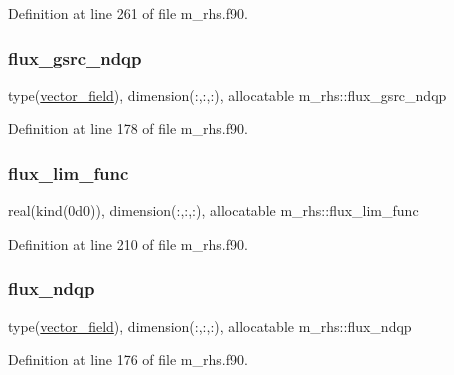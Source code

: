Definition at line 261 of file m\+\_\+rhs.\+f90.

\mbox{\label{namespacem__rhs_a5542f5954178123cbe052df43d09dc38}} 
\subsubsection{\texorpdfstring{flux\+\_\+gsrc\+\_\+ndqp}{flux\_gsrc\_ndqp}}
{\footnotesize\ttfamily type(\hyperlink{structm__derived__types_1_1vector__field}{vector\+\_\+field}), dimension(\+:,\+:,\+:), allocatable m\+\_\+rhs\+::flux\+\_\+gsrc\+\_\+ndqp}



Definition at line 178 of file m\+\_\+rhs.\+f90.

\mbox{\label{namespacem__rhs_a93dc4910f18014dacfb740debe18356d}} 
\subsubsection{\texorpdfstring{flux\+\_\+lim\+\_\+func}{flux\_lim\_func}}
{\footnotesize\ttfamily real(kind(0d0)), dimension(\+:,\+:,\+:), allocatable m\+\_\+rhs\+::flux\+\_\+lim\+\_\+func}



Definition at line 210 of file m\+\_\+rhs.\+f90.

\mbox{\label{namespacem__rhs_a10d1ea6f5c8a0d7137be28b1e8c4780f}} 
\subsubsection{\texorpdfstring{flux\+\_\+ndqp}{flux\_ndqp}}
{\footnotesize\ttfamily type(\hyperlink{structm__derived__types_1_1vector__field}{vector\+\_\+field}), dimension(\+:,\+:,\+:), allocatable m\+\_\+rhs\+::flux\+\_\+ndqp}



Definition at line 176 of file m\+\_\+rhs.\+f90.

